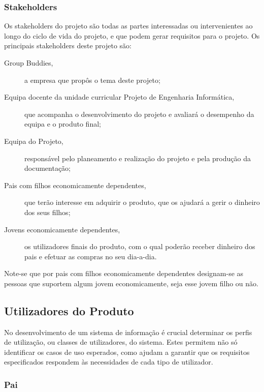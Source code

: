 \documentclass[12pt,a4paper]{article}
\begin{document}
    \subsubsection{Stakeholders}  

      Os stakeholders do projeto são todas as partes interessadas ou intervenientes ao longo do ciclo de vida do projeto, e que podem gerar requisitos para o projeto. Os principais stakeholders deste projeto são:

        \begin{description}
          \item[Group Buddies,]a empresa que propôs o tema deste projeto;
          \item[Equipa docente da unidade curricular Projeto de Engenharia Informática,] que acompanha o desenvolvimento do projeto e avaliará o desempenho da equipa e o produto final;
          \item[Equipa do Projeto,] responsável pelo planeamento e realização do projeto e pela produção da documentação;
          \item[Pais com filhos economicamente dependentes,]que terão interesse em adquirir o produto, que os ajudará a gerir o dinheiro dos seus filhos;
          \item[Jovens economicamente dependentes,] os utilizadores finais do produto, com o qual poderão receber dinheiro dos pais e efetuar as compras no seu dia-a-dia.
        \end{description}

      Note-se que por pais com filhos economicamente dependentes designam-se as pessoas que suportem algum jovem economicamente, seja esse jovem filho ou não.

  \subsection{Utilizadores do Produto}

    No desenvolvimento de um sistema de informação é crucial determinar os perfis de utilização, ou classes de utilizadores, do sistema. Estes permitem não só identificar os casos de uso esperados, como ajudam a garantir que os requisitos especificados respondem às necessidades de cada tipo de utilizador.

    \subsubsection{Pai}
\end{document}
